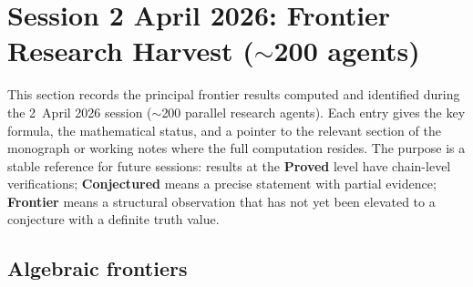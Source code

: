 \documentclass[11pt]{article}
\begin{document}
\section{Session 2 April 2026: Frontier Research Harvest ($\sim$200 agents)}
\label{sec:frontier-harvest-2apr2026}

This section records the principal frontier results computed and identified
during the 2~April 2026 session ($\sim$200 parallel research agents).
Each entry gives the key formula, the mathematical status, and a pointer
to the relevant section of the monograph or working notes where the full
computation resides.  The purpose is a stable reference for future sessions:
results at the \textbf{Proved} level have chain-level verifications;
\textbf{Conjectured} means a precise statement with partial evidence;
\textbf{Frontier} means a structural observation that has not yet been
elevated to a conjecture with a definite truth value.

\subsection{Algebraic frontiers}
\label{ssec:alg-frontiers}
\end{document}
